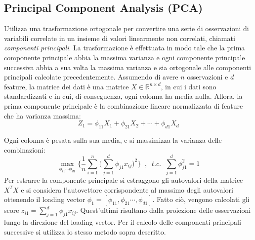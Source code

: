 \documentclass[11pt,a4paper,twocolumn]{article}
\begin{document}
\subsection{Principal Component Analysis (PCA)}
Utilizza una trasformazione ortogonale per convertire una serie di osservazioni di variabili correlate in un insieme di valori linearmente non correlati, chiamati \emph{componenti principali}. La trasformazione è effettuata in modo tale che la prima componente principale abbia la massima varianza e ogni componente principale successiva abbia a sua volta la massima varianza e sia ortogonale alle componenti principali calcolate precedentemente. Assumendo di avere $ n $ osservazioni e $ d $ feature, la matrice dei dati è una matrice $ X \in \mathbb{R}^{n \times d} $, in cui i dati sono standardizzati e in cui, di conseguenza, ogni colonna ha media nulla. Allora, la prima componente principale è la combinazione lineare normalizzata di feature che ha varianza massima:
\begin{equation}
\nonumber
Z_1=\phi_{11}X_1+\phi_{21}	X_2+\cdots+\phi_{d1}	X_d
\end{equation}

 Ogni colonna è pesata sulla sua media, e si massimizza la varianza delle combinazioni:
\begin{equation}
\nonumber
\max_{\phi_{i1} \cdots \phi_{d1}}{\Biggl\{\frac{1}{n} \sum_{i=1}^n{\Biggl(\sum_{j=1}^d{\phi_{j1}x_{ij}}\Biggr)^2}\Biggr\}} \; \; , \; \; t.c. \; \; \sum_{j=1}^d{\phi_{j1}^2}=1
\end{equation}
Per estrarre la componente principale si estraggono gli autovalori della matrice $X^TX$ e si considera l'autovettore corrispondente al massimo degli autovalori ottenendo il loading vector $\phi_1=[\phi_{11},\phi_{21} \cdots , \phi_{d1}]$. Fatto ciò, vengono calcolati gli score $z_{i1}=\sum_{j=1}^d{\phi_{j1} x_{ij}}$. Quest'ultimi risultano dalla proiezione delle osservazioni lungo la direzione del loading vector. Per il calcolo delle componenti principali successive si utilizza lo stesso metodo sopra descritto.
\end{document}
